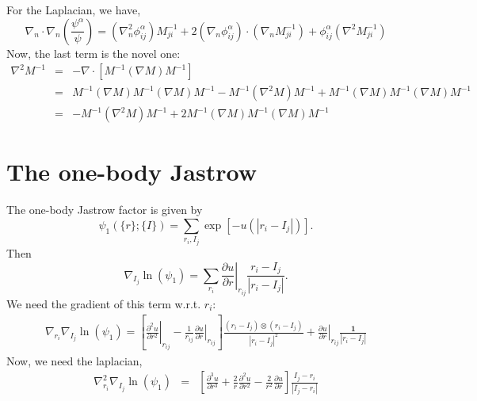 \documentclass{article}
\begin{document}
For the Laplacian, we have,
\begin{equation}
\nabla_n\cdot\nabla_n\left(\frac{\psi^\alpha}{\psi}\right) =
(\nabla_n^2\phi_{ij}^\alpha)M^{-1}_{ji} +
2(\nabla_n\phi_{ij}^\alpha)\cdot(\nabla_n M^{-1}_{ji}) +
\phi^\alpha_{ij}(\nabla^2 M^{-1}_{ji})
\end{equation} 
Now, the last term is the novel one:
\begin{eqnarray}
\nabla^2 M^{-1} & = & -\nabla\cdot [M^{-1}(\nabla M) M^{-1}] \\
& = & M^{-1}(\nabla M)M^{-1}(\nabla M) M^{-1} - M^{-1}(\nabla^2 M)M^{-1}
+ M^{-1}(\nabla M) M^{-1} (\nabla M) M^{-1} \\
& = & -M^{-1} (\nabla^2 M) M^{-1} + 2 M^{-1}(\nabla M) M^{-1}(\nabla M) M^{-1}
\end{eqnarray}

\section{The one-body Jastrow}
The one-body Jastrow factor is given by
\begin{equation}
\psi_1(\{r\};\{I\}) = \sum_{r_i,I_j} \exp\left[-u(|r_i - I_j|)\right].
\end{equation}
Then
\begin{equation}
\nabla_{I_j} \ln(\psi_1) = \sum_{r_i} \left.\frac{\partial u}{\partial r}\right|_{r_{ij}} \frac{r_i - I_j}{|r_i-I_j|}.
\end{equation}
We need the gradient of this term w.r.t. $r_i$:
\begin{eqnarray}
\nabla_{r_i} \nabla_{I_j} \ln(\psi_1) = 
\left[\left.\frac{\partial^2 u}{\partial r^2} \right|_{r_{ij}} 
- \frac{1}{r_{ij}}\left.\frac{\partial u}{\partial r}\right|_{r_{ij}}
\right]\frac{(r_i - I_j)\otimes(r_i-I_j)}{|r_i-I_j|^2} + \left.\frac{\partial u}{\partial r}\right|_{r_{ij}} 
\frac{\mathbf{1}}{|r_i - I_j|}
\end{eqnarray}
Now, we need the laplacian,
\begin{eqnarray}
\nabla^2_{r_i} \nabla_{I_j} \ln(\psi_1) & = & \left[
\frac{\partial^3 u}{\partial r^3} + \frac{2}{r}\frac{\partial^2u}{\partial r^2} - \frac{2}{r^2}\frac{\partial u}{\partial r} \right] 
\frac{I_j - r_i}{|I_j - r_i|}
\end{eqnarray}
\end{document}

